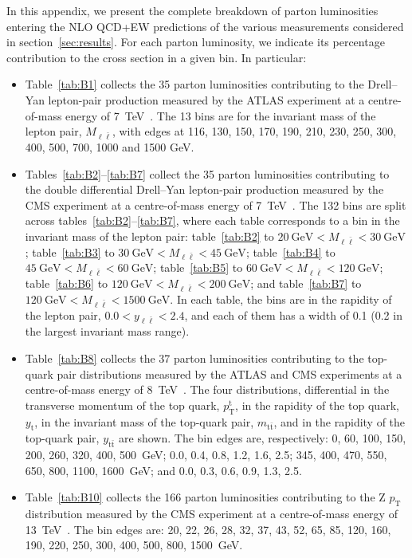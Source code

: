 In this appendix, we present the complete breakdown of parton luminosities
entering the NLO QCD+EW predictions of the various measurements
considered in section~\ref{sec:results}. For each parton luminosity,
we indicate its percentage contribution to the cross section in a given bin.
In particular:
\begin{itemize}
\item Table~\ref{tab:B1} collects the 35 parton luminosities
  contributing to the Drell--Yan lepton-pair production measured by the
  ATLAS experiment at a centre-of-mass energy of
  \SI{7}{\tera\electronvolt}~\cite{Aad:2013iua}.
  The 13 bins are for the invariant mass of the lepton pair,
  $M_{\ell\bar\ell}$, with edges at 116, 130, 150, 170, 190,
  210, 230, 250, 300, 400, 500, 700, 1000 and 1500 GeV.
\item Tables~\ref{tab:B2}--\ref{tab:B7} collect the 35 parton
  luminosities contributing to the double differential Drell--Yan lepton-pair
  production measured by the CMS experiment at a centre-of-mass energy of
  \SI{7}{\tera\electronvolt}~\cite{Aad:2013iua}. The 132
  bins are split across tables~\ref{tab:B2}--\ref{tab:B7}, where each table
  corresponds to a bin in the invariant mass of the lepton pair:
  table~\ref{tab:B2} to  $\SI{20}{\giga\electronvolt}<M_{\ell\bar\ell}<\SI{30}{\giga\electronvolt}$; table~\ref{tab:B3} to  $\SI{30}{\giga\electronvolt}<M_{\ell\bar\ell}<\SI{45}{\giga\electronvolt}$; table~\ref{tab:B4} to  $\SI{45}{\giga\electronvolt}<M_{\ell\bar\ell}<\SI{60}{\giga\electronvolt}$; table~\ref{tab:B5} to  $\SI{60}{\giga\electronvolt}<M_{\ell\bar\ell}<\SI{120}{\giga\electronvolt}$; table~\ref{tab:B6} to $\SI{120}{\giga\electronvolt}<M_{\ell\bar\ell}<\SI{200}{\giga\electronvolt}$; and table~\ref{tab:B7} to $\SI{120}{\giga\electronvolt}<M_{\ell\bar\ell}<\SI{1500}{\giga\electronvolt}$. In each table, the bins are in the rapidity of the lepton pair, $0.0<y_{\ell\bar\ell}<2.4$, and each of them has a width of 0.1 (0.2 in the largest invariant mass range).
\item Table~\ref{tab:B8} collects the 37 parton luminosities
  contributing to the top-quark pair distributions measured by the ATLAS and
  CMS experiments at a centre-of-mass energy of
  \SI{8}{\tera\electronvolt}~\cite{Aad:2015mbv,Khachatryan:2015oqa}.
  The four distributions, differential in the transverse momentum of the top
  quark, $p_\mathrm{T}^\mathrm{t}$, in the rapidity of the top quark,
  $y_\mathrm{t}$, in the invariant mass of the top-quark pair,
  $m_{\mathrm{t}\bar{\mathrm{t}}}$, and in the rapidity of the top-quark pair,
  $y_{\mathrm{t}\bar{\mathrm{t}}}$ are shown. The bin edges are, respectively:
  0, 60, 100, 150, 200, 260, 320, 400, 500~GeV; 0.0, 0.4, 0.8, 1.2, 1.6, 2.5;
  345, 400, 470, 550, 650, 800, 1100, 1600~GeV;
  and 0.0, 0.3, 0.6, 0.9, 1.3, 2.5.
\item Table~\ref{tab:B10} collects the 166
  parton luminosities contributing to the Z $p_{\mathrm{T}}$ distribution
  measured by the CMS experiment at a centre-of-mass energy of
  \SI{13}{\tera\electronvolt}~\cite{Sirunyan:2019bzr}. The bin edges are:
  20, 22, 26, 28, 32, 37, 43, 52, 65, 85, 120, 160, 190, 220, 250, 300,
  400, 500, 800, 1500~GeV.
\end{itemize}
